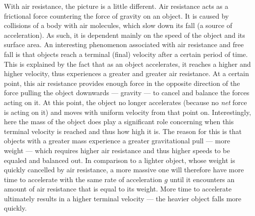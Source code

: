 With air resistance, the picture is a little different. Air resistance acts as a frictional force countering the force of gravity on an object. It is caused by collisions of a body with air molecules, which slow down its fall (a source of acceleration). As such, it is dependent mainly on the speed of the object and its surface area. An interesting phenomenon associated with air resistance and free fall is that objects reach a terminal (final) velocity after a certain period of time. This is explained by the fact that as an object accelerates, it reaches a higher and higher velocity, thus experiences a greater and greater air resistance. At a certain point, this air resistance provides enough force in the opposite direction of the force pulling the object downwards --- gravity --- to cancel and balance the forces acting on it. At this point, the object no longer accelerates (because no \emph{net} force is acting on it) and moves with uniform velocity from that point on. Interestingly, here the mass of the object does play a significant role concerning when this terminal velocity is reached and thus how high it is. The reason for this is that objects with a greater mass experience a greater gravitational pull --- more weight --- which requires higher air resistance and thus higher speeds to be equaled and balanced out. In comparison to a lighter object, whose weight is quickly cancelled by air resistance, a more massive one will therefore have more time to accelerate with the same rate of acceleration $g$ until it encounters an amount of air resistance that is equal to its weight. More time to accelerate ultimately results in a higher terminal velocity --- the heavier object falls more quickly.

\begin{figure}[h!]
	\centering
\end{figure}

